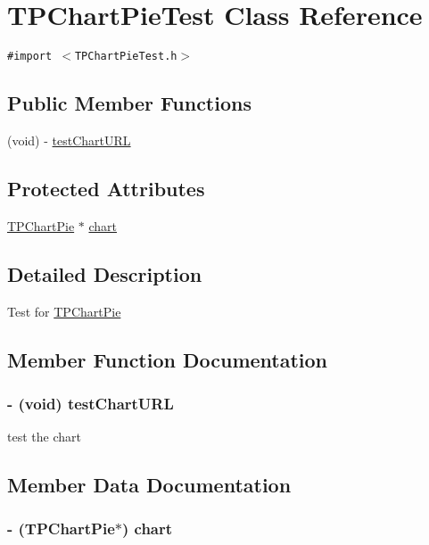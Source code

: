 \hypertarget{interface_t_p_chart_pie_test}{
\section{TPChartPieTest Class Reference}
\label{interface_t_p_chart_pie_test}
}
{\tt \#import $<$TPChartPieTest.h$>$}

\subsection*{Public Member Functions}
\begin{CompactItemize}
\item 
(void) - \hyperlink{interface_t_p_chart_pie_test_665b07d352790d8bd59d9ddd6d6f147f}{testChartURL}
\end{CompactItemize}
\subsection*{Protected Attributes}
\begin{CompactItemize}
\item 
\hyperlink{interface_t_p_chart_pie}{TPChartPie} $\ast$ \hyperlink{interface_t_p_chart_pie_test_2d4535c23355925f1e14f58937df1456}{chart}
\end{CompactItemize}


\subsection{Detailed Description}
Test for \hyperlink{interface_t_p_chart_pie}{TPChartPie} 

\subsection{Member Function Documentation}
\hypertarget{interface_t_p_chart_pie_test_665b07d352790d8bd59d9ddd6d6f147f}{
\subsubsection[{testChartURL}]{\setlength{\rightskip}{0pt plus 5cm}- (void) testChartURL }}
\label{interface_t_p_chart_pie_test_665b07d352790d8bd59d9ddd6d6f147f}


test the chart 

\subsection{Member Data Documentation}
\hypertarget{interface_t_p_chart_pie_test_2d4535c23355925f1e14f58937df1456}{
\subsubsection[{chart}]{\setlength{\rightskip}{0pt plus 5cm}- ({\bf TPChartPie}$\ast$) {\bf chart}}}
\label{interface_t_p_chart_pie_test_2d4535c23355925f1e14f58937df1456}


